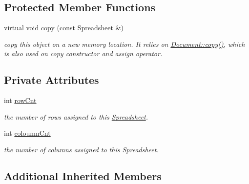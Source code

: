 \subsection*{Protected Member Functions}
\begin{DoxyCompactItemize}
\item 
\hypertarget{classdocs_1_1Spreadsheet_ad7ab608a90b53969ec97214c447c43c6}{virtual void \hyperlink{classdocs_1_1Spreadsheet_ad7ab608a90b53969ec97214c447c43c6}{copy} (const \hyperlink{classdocs_1_1Spreadsheet}{Spreadsheet} \&)}\label{classdocs_1_1Spreadsheet_ad7ab608a90b53969ec97214c447c43c6}

\begin{DoxyCompactList}\small\item\em copy this object on a new memory location. It relies on \hyperlink{classdocs_1_1Document_ad8b6a91c7a8e39a880790d14aba14322}{Document\-::copy()}, which is also used on copy constructor and assign operator. \end{DoxyCompactList}\end{DoxyCompactItemize}
\subsection*{Private Attributes}
\begin{DoxyCompactItemize}
\item 
\hypertarget{classdocs_1_1Spreadsheet_a69756007b1fbe6b45d2f052af930d748}{int \hyperlink{classdocs_1_1Spreadsheet_a69756007b1fbe6b45d2f052af930d748}{row\-Cnt}}\label{classdocs_1_1Spreadsheet_a69756007b1fbe6b45d2f052af930d748}

\begin{DoxyCompactList}\small\item\em the number of rows assigned to this \hyperlink{classdocs_1_1Spreadsheet}{Spreadsheet}. \end{DoxyCompactList}\item 
\hypertarget{classdocs_1_1Spreadsheet_a8193931da11e83c62b3aa1c2177e9e33}{int \hyperlink{classdocs_1_1Spreadsheet_a8193931da11e83c62b3aa1c2177e9e33}{coloumn\-Cnt}}\label{classdocs_1_1Spreadsheet_a8193931da11e83c62b3aa1c2177e9e33}

\begin{DoxyCompactList}\small\item\em the number of columns assigned to this \hyperlink{classdocs_1_1Spreadsheet}{Spreadsheet}. \end{DoxyCompactList}\end{DoxyCompactItemize}
\subsection*{Additional Inherited Members}


